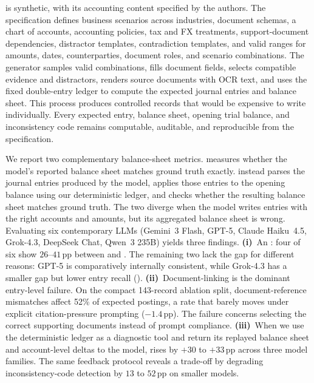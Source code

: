 \benchmark{} is synthetic, with its accounting content specified by the authors. The specification defines business scenarios across industries, document schemas, a chart of accounts, accounting policies, tax and FX treatments, support-document dependencies, distractor templates, contradiction templates, and valid ranges for amounts, dates, counterparties, document roles, and scenario combinations. The generator samples valid combinations, fills document fields, selects compatible evidence and distractors, renders source documents with OCR text, and uses the fixed double-entry ledger to compute the expected journal entries and balance sheet. This process produces controlled records that would be expensive to write individually. Every expected entry, balance sheet, opening trial balance, and inconsistency code remains computable, auditable, and reproducible from the specification.

We report two complementary balance-sheet metrics. \bsexact{} measures whether the model's reported balance sheet matches ground truth exactly. \bsrecon{} instead parses the journal entries produced by the model, applies those entries to the opening balance using our deterministic ledger, and checks whether the resulting balance sheet matches ground truth. The two diverge when the model writes entries with the right accounts and amounts, but its aggregated balance sheet is wrong. Evaluating six contemporary LLMs (Gemini~3 Flash, GPT-5, Claude Haiku~4.5, Grok-4.3, DeepSeek Chat, Qwen~3 235B) yields three findings. \textbf{(i)}~An \aggGap{}: four of six show $26$--$41$\,pp between \bsrecon{} and \bsexact{}. The remaining two lack the gap for different reasons: GPT-5 is comparatively internally consistent, while Grok-4.3 has a smaller gap but lower entry recall (). \textbf{(ii)}~Document-linking is the dominant entry-level failure. On the compact 143-record ablation split, document-reference mismatches affect 52\% of expected postings, a rate that barely moves under explicit citation-pressure prompting ($-1.4$\,pp). The failure concerns selecting the correct supporting documents instead of prompt compliance. \textbf{(iii)}~When we use the deterministic ledger as a diagnostic tool and return its replayed balance sheet and account-level deltas to the model, \bsexact{} rises by $+30$ to $+33$\,pp across three model families. The same feedback protocol reveals a trade-off by degrading inconsistency-code detection by $13$ to $52$\,pp on smaller models.

